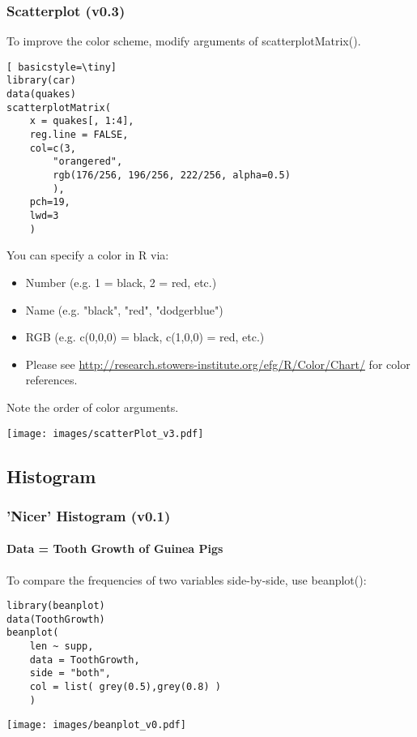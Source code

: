 \begin{frame}
\frametitle{Scatterplot (v0.3)}

To improve the color scheme, modify arguments of \ttfamily scatterplotMatrix().  
  		\begin{lstlisting}[ basicstyle=\tiny]
library(car)		
data(quakes)
scatterplotMatrix(
	x = quakes[, 1:4], 
	reg.line = FALSE,
	col=c(3,
		"orangered",
		rgb(176/256, 196/256, 222/256, alpha=0.5)
		), 
	pch=19,
	lwd=3
	)
		\end{lstlisting}
\normalfont
\framebreak
You can specify a color in R via: 
\begin{itemize}
	\item Number (e.g. 1 = black, 2 = red, etc.)
	\item Name (e.g. "black", "red", "dodgerblue")
	\item RGB (e.g. c(0,0,0) = black, c(1,0,0) = red, etc.)
	\item Please see \url{http://research.stowers-institute.org/efg/R/Color/Chart/} for color references. 
\end{itemize}

\noindent Note the order of color arguments. \normalfont
        \begin{center}
         \texttt{[image: images/scatterPlot\_v3.pdf]}
        \end{center}
\end{frame}

\subsection{Histogram}
\begin{frame}
\frametitle{'Nicer' Histogram (v0.1)}
  \framesubtitle{Data = Tooth Growth of Guinea Pigs}

To compare the frequencies of two variables side-by-side, use \ttfamily beanplot(): \normalfont

	\begin{lstlisting}
library(beanplot)
data(ToothGrowth)
beanplot(
	len ~ supp, 
	data = ToothGrowth, 
	side = "both", 
	col = list( grey(0.5),grey(0.8) )
	)
	\end{lstlisting}

        \begin{center}
	         \texttt{[image: images/beanplot\_v0.pdf]}
        \end{center}

\end{frame}

